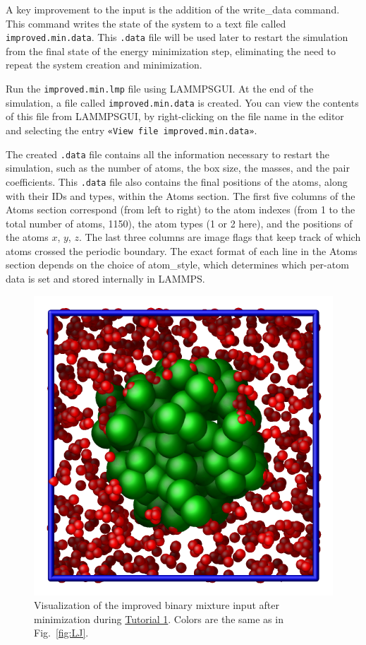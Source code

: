 \documentclass[9pt,tutorial]{livecoms}
\newcommand{\lmpcmd}[1]{\hspace{0pt}\colorbox{listing}{\textcolor{command}{\small{#1}}}\hspace{0pt}} %
\newcommand{\flecmd}[1]{\textcolor{command}{\texttt{#1}}} %
\newcommand{\guicmd}[1]{\textcolor{command}{\texttt{«#1»}}} %
\newcommand{\lammpsgui}{\textsf{LAMMPS\textendash GUI}}
\begin{document}
\begin{note}
  A key improvement to the input is the addition of the
  \lmpcmd{write\_data} command.  This command writes the state of the
  system to a text file called \flecmd{improved.min.data}.  This
  \flecmd{.data} file will be used later to restart the simulation from
  the final state of the energy minimization step, eliminating the need
  to repeat the system creation and minimization.
\end{note}

Run the \flecmd{improved.min.lmp} file using \lammpsgui{}.  At the end
of the simulation, a file called \flecmd{improved.min.data} is created.
You can view the contents of this file from \lammpsgui{}, by
right-clicking on the file name in the editor and selecting the entry
\guicmd{View file improved.min.data}.

The created \flecmd{.data} file contains all the information necessary
to restart the simulation, such as the number of atoms, the box size,
the masses, and the pair coefficients.   {\color{blue}This \flecmd{.data} file also
contains the final positions of the atoms, along with their IDs and types,
within the \lmpcmd{Atoms} section.}  The first five columns of the \lmpcmd{Atoms} section
correspond (from left to right) to the atom indexes (from 1 to the total
number of atoms, 1150), the atom types (1 or 2 here), and the positions
of the atoms $x$, $y$, $z$.  The last three columns are image flags that
keep track of which atoms crossed the periodic boundary.  The exact
format of each line in the \lmpcmd{Atoms} section depends on the choice
of \lmpcmd{atom\_style}, which determines which per-atom data is set and
stored internally in LAMMPS.

\begin{figure}
\centering
\includegraphics[width=0.55\linewidth]{LJ-cylinder}
\caption{Visualization of the improved binary mixture input after minimization
  during \hyperref[lennard-jones-label]{Tutorial 1}.  Colors are the same as in
  Fig.~\ref{fig:LJ}.}
\label{fig:improved-min}
\end{figure}
\end{document}
